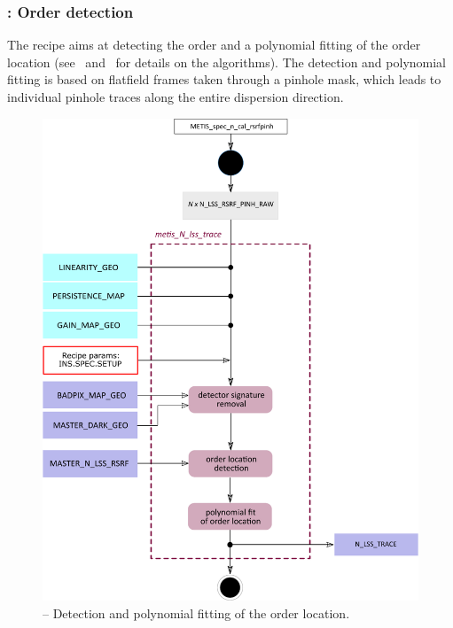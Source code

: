 \subsubsection{:  Order detection}\label{rec:metis_n_lss_trace}
The recipe  aims at detecting the order and a polynomial fitting of the order location (see~\cite{pis02} and~\cite{pis21} for details on the algorithms). The detection and polynomial fitting is based on flatfield frames taken through a pinhole mask, which leads to individual pinhole traces along the entire dispersion direction.

\begin{figure}[ht]
  \centering
  \includegraphics[width=0.5\textheight]{figures/metis_N_lss_trace_v0.83.pdf}
  \caption[Recipe: ]{ --
    Detection and polynomial fitting of the order location.}
  \label{Fig:rec_N_lss_wave}
\end{figure}

